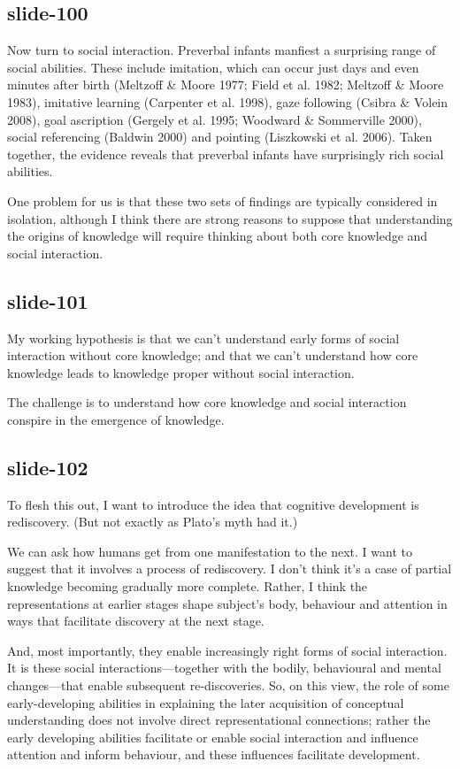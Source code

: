 \documentclass[12pt,\papersize]{extarticle}
\begin{document}
 
 
\subsection{slide-100}
Now turn to social interaction. Preverbal infants manfiest a surprising range of social abilities. These include imitation, which can occur just days and even minutes after birth (Meltzoff \& Moore 1977; Field et al. 1982; Meltzoff \& Moore 1983), imitative learning (Carpenter et al. 1998), gaze following (Csibra \& Volein 2008), goal ascription (Gergely et al. 1995; Woodward \& Sommerville 2000), social referencing (Baldwin 2000) and pointing (Liszkowski et al. 2006). Taken together, the evidence reveals that preverbal infants have surprisingly rich social abilities.
 
One problem for us is that these two sets of findings are typically considered in isolation, although I think there are strong reasons to suppose that understanding the origins of knowledge will require thinking about both core knowledge and social interaction.
 
 
 
\subsection{slide-101}
My working hypothesis is that we can't understand early forms of social interaction without core knowledge; and that we can't understand how core knowledge leads to knowledge proper without social interaction.
 
The challenge is to understand how core knowledge and social interaction conspire in the emergence of knowledge.
 
 
 
\subsection{slide-102}
To flesh this out, I want to introduce the idea that cognitive development is rediscovery. (But not exactly as Plato's myth had it.)
 
We can ask how humans get from one manifestation to the next. I want to suggest that it involves a process of rediscovery. I don't think it's a case of partial knowledge becoming gradually more complete. Rather, I think the representations at earlier stages shape subject's body, behaviour and attention in ways that facilitate discovery at the next stage.
 
And, most importantly, they enable increasingly right forms of social interaction. It is these social interactions---together with the bodily, behavioural and mental changes---that enable subsequent re-discoveries. So, on this view, the role of some early-developing abilities in explaining the later acquisition of conceptual understanding does not involve direct representational connections; rather the early developing abilities facilitate or enable social interaction and influence attention and inform behaviour, and these influences facilitate development.
 
\end{document}
